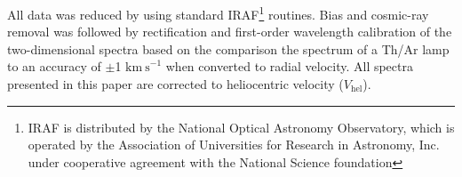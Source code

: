 \documentclass[useAMS, usenatbib]{mnras}
\makeatletter
\newcounter{ionstage}
\renewcommand{\ion}[2]{\setcounter{ionstage}{#2}%
  \ensuremath{\mathrm{#1\,\scriptstyle\Roman{ionstage}}}}
\newcommand\oiii{[\ion{O}{3}]}
\newcommand{\kms}{\ensuremath{\mathrm{km\ s}^{-1}}}
\newcommand\NIIlam{[\ion{N}{2}]\,6583\,}
\newcommand\OIIIlam{[\ion{O}{3}]\,5007\,\AA\@}
\newcommand\Halam{H$\alpha$\,6563\,\AA\@}
\newcommand{\vhel}{\ensuremath{V_\mathrm{hel}}}
\makeatother
\begin{document}
All data was reduced  by using standard IRAF\footnote{IRAF is
  distributed by the National Optical Astronomy Observatory, which is
  operated by the Association of Universities for Research in
  Astronomy, Inc. under cooperative agreement with the National
  Science foundation} routines.
Bias and cosmic-ray removal was followed by rectification and first-order wavelength 
calibration of the two-dimensional spectra
based on the comparison the spectrum
of a Th/Ar lamp to an accuracy of $\pm$1 \kms{} when converted to radial velocity.
All spectra presented in this paper are corrected to heliocentric velocity (\vhel). 













\end{document}
